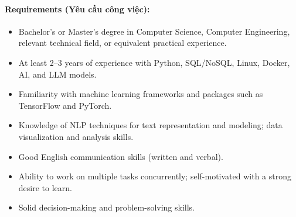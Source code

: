 \paragraph{Requirements (Yêu cầu công việc):}
\begin{itemize}
    \item Bachelor's or Master's degree in Computer Science, Computer Engineering, relevant technical field, or equivalent practical experience.
    \item At least 2--3 years of experience with Python, SQL/NoSQL, Linux, Docker, AI, and LLM models.
    \item Familiarity with machine learning frameworks and packages such as TensorFlow and PyTorch.
    \item Knowledge of NLP techniques for text representation and modeling; data visualization and analysis skills.
    \item Good English communication skills (written and verbal).
    \item Ability to work on multiple tasks concurrently; self-motivated with a strong desire to learn.
    \item Solid decision-making and problem-solving skills.
\end{itemize}
